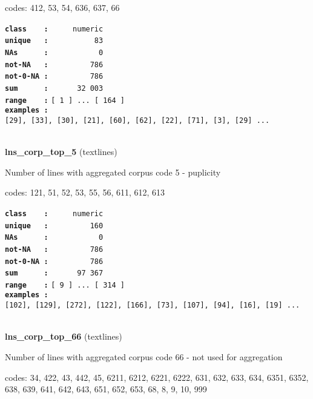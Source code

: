 \documentclass[]{article}
\begin{document}
codes: 412, 53, 54, 636, 637, 66

\textbf{\texttt{class\ \ \ \ :}} \texttt{~~~~~numeric}\\
\textbf{\texttt{unique\ \ \ :}} \texttt{~~~~~~~~~~83}\\
\textbf{\texttt{NAs\ \ \ \ \ \ :}} \texttt{~~~~~~~~~~~0}\\
\textbf{\texttt{not-NA\ \ \ :}} \texttt{~~~~~~~~~786}\\
\textbf{\texttt{not-0-NA\ :}} \texttt{~~~~~~~~~786}\\
\textbf{\texttt{sum\ \ \ \ \ \ :}} \texttt{~~~~~~32~003}\\
\textbf{\texttt{range\ \ \ \ :}}
\texttt{{[}\ 1\ {]}\ ...\ {[}\ 164\ {]}}\\
\textbf{\texttt{examples\ :}}
\texttt{{[}29{]},\ {[}33{]},\ {[}30{]},\ {[}21{]},\ {[}60{]},\ {[}62{]},\ {[}22{]},\ {[}71{]},\ {[}3{]},\ {[}29{]}\ ...}\\

~

\textbf{lns\_corp\_top\_5} (textlines)

Number of lines with aggregated corpus code 5 - puplicity

codes: 121, 51, 52, 53, 55, 56, 611, 612, 613

\textbf{\texttt{class\ \ \ \ :}} \texttt{~~~~~numeric}\\
\textbf{\texttt{unique\ \ \ :}} \texttt{~~~~~~~~~160}\\
\textbf{\texttt{NAs\ \ \ \ \ \ :}} \texttt{~~~~~~~~~~~0}\\
\textbf{\texttt{not-NA\ \ \ :}} \texttt{~~~~~~~~~786}\\
\textbf{\texttt{not-0-NA\ :}} \texttt{~~~~~~~~~786}\\
\textbf{\texttt{sum\ \ \ \ \ \ :}} \texttt{~~~~~~97~367}\\
\textbf{\texttt{range\ \ \ \ :}}
\texttt{{[}\ 9\ {]}\ ...\ {[}\ 314\ {]}}\\
\textbf{\texttt{examples\ :}}
\texttt{{[}102{]},\ {[}129{]},\ {[}272{]},\ {[}122{]},\ {[}166{]},\ {[}73{]},\ {[}107{]},\ {[}94{]},\ {[}16{]},\ {[}19{]}\ ...}\\

~

\textbf{lns\_corp\_top\_66} (textlines)

Number of lines with aggregated corpus code 66 - not used for
aggregation

codes: 34, 422, 43, 442, 45, 6211, 6212, 6221, 6222, 631, 632, 633, 634,
6351, 6352, 638, 639, 641, 642, 643, 651, 652, 653, 68, 8, 9, 10, 999
\end{document}
